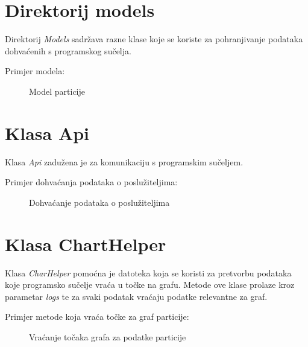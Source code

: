 \documentclass[zavrsnirad]{fer}
\begin{document}
\section{Direktorij models}
Direktorij \textit{Models} sadržava razne klase koje se koriste za pohranjivanje podataka dohvaćenih s programskog sučelja.

Primjer modela:
\begin{figure}[htb]
	\centering
	
	\caption{Model particije}
\end{figure}
\FloatBarrier

\section{Klasa Api}
Klasa \textit{Api} zadužena je za komunikaciju s programskim sučeljem.

Primjer dohvaćanja podataka o poslužiteljima:
\begin{figure}[htb]
	\centering
	
	\caption{Dohvaćanje podataka o poslužiteljima}
\end{figure}
\FloatBarrier

\section{Klasa ChartHelper}
Klasa \textit{CharHelper} pomoćna je datoteka koja se koristi za pretvorbu podataka koje programsko sučelje vraća u točke na grafu. Metode ove klase prolaze kroz parametar \textit{logs} te za svaki podatak vraćaju podatke relevantne za graf.

Primjer metode koja vraća točke za graf particije:
\begin{figure}[htb]
	\centering
	
	\caption{Vraćanje točaka grafa za podatke particije}
\end{figure}
\FloatBarrier
\end{document}
